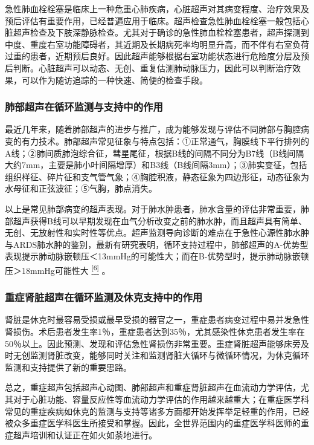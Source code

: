 急性肺血栓栓塞是临床上一种危重心肺疾病，心脏超声对其病变程度、治疗效果及预后评估有重要作用，已经普遍应用于临床。超声检查急性肺血栓栓塞一般包括心脏超声检查及下肢深静脉检查。尤其对于确诊的急性肺血栓栓塞患者，超声探测到中度、重度右室功能障碍者，其近期及长期病死率均明显升高，而不伴有右室负荷过重的患者，近期预后良好。因此超声能够根据右室功能状态进行危险度分层及预后判断。心脏超声可以动态、无创、重复估测肺动脉压力，因此可以判断治疗效果，可以作为随访追踪的一种快速、简便的检查手段。

\subsubsection{肺部超声在循环监测与支持中的作用}

最近几年来，随着肺部超声的进步与推广，成为能够发现与评估不同肺部与胸腔病变的有力技术。肺部超声常见征象与特点包括：①正常通气，胸膜线下平行排列的A线；②肺间质肺泡综合征，彗星尾征，根据B线的间隔不同分为B7线（B线间隔大约7mm，主要是肺小叶间隔增厚）和B3线（B线间隔3mm）；③肺实变征，包括组织样征、碎片征和支气管气象；④胸腔积液，静态征象为四边形征，动态征象为水母征和正弦波征；⑤气胸，肺点消失。

以上是常见肺部病变的超声表现。对于肺水肿患者，肺水含量的评估非常重要，肺部超声获得B线可以早期发现在血气分析改变之前的肺水肿，而且超声具有简单、无创、无放射性和实时性等优点。超声监测导向诊断的难点在于急性心源性肺水肿与ARDS肺水肿的鉴别，最新有研究表明，循环支持过程中，肺部超声的A-优势型表现提示肺动脉嵌顿压＜13mmHg的可能性大；而在B-优势型时，提示肺动脉嵌顿压＞18mmHg可能性大
\protect\hyperlink{text00009.htmlux5cux23ch6-8}{\textsuperscript{{[}6{]}}}
。

\subsubsection{重症肾脏超声在循环监测及休克支持中的作用}

肾脏是休克时最容易受损或最早受损的器官之一，重症患者病变过程中易并发急性肾损伤。术后患者发生率1％，重症患者达到35％，尤其感染性休克患者发生率在50％以上。因此预测、发现和评估急性肾损伤非常重要。重症肾脏超声能够床旁及时无创监测肾脏改变，能够同时关注和监测肾脏大循环与微循环情况，为休克循环监测和支持提供了新的重要思路。

总之，重症超声包括超声心动图、肺部超声和重症肾脏超声在血流动力学评估，尤其对于心脏功能、容量反应性等血流动力学评估的作用越来越重大；在重症医学科常见的重症疾病如休克的监测与支持等诸多方面都开始发挥举足轻重的作用，已经被众多重症医学科医生所接受和掌握。因此，全世界范围内的重症医学科医师的重症超声培训和认证正在如火如荼地进行。

